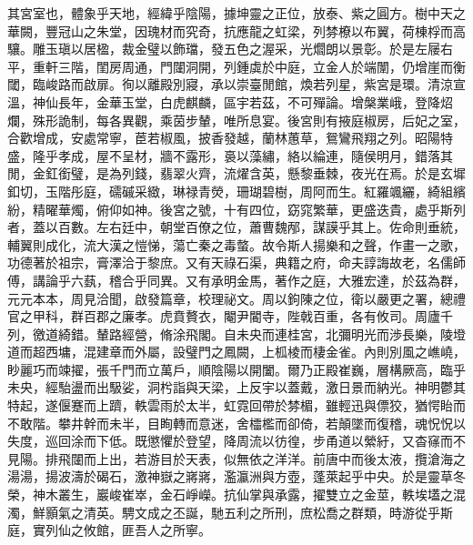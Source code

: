 \begin{pinyinscope}
其宮室也，體象乎天地，經緯乎陰陽，據坤靈之正位，放泰、紫之圓方。樹中天之華闕，豐冠山之朱堂，因瑰材而究奇，抗應龍之虹梁，列棼橑以布翼，荷棟桴而高驤。雕玉瑱以居楹，裁金璧以飾璫，發五色之渥采，光爓朗以景彰。於是左屦右平，重軒三階，閨房周通，門闥洞開，列鍾虡於中庭，立金人於端闈，仍增崖而衡閾，臨峻路而啟扉。徇以離殿別寢，承以崇臺閒館，煥若列星，紫宮是環。清涼宣溫，神仙長年，金華玉堂，白虎麒麟，區宇若茲，不可殫論。增槃業峨，登降炤爛，殊形詭制，每各異觀，乘茵步輦，唯所息宴。後宮則有掖庭椒房，后妃之室，合歡增成，安處常寧，茞若椒風，披香發越，蘭林蕙草，鴛鸞飛翔之列。昭陽特盛，隆乎孝成，屋不呈材，牆不露形，裛以藻繡，絡以綸連，隨侯明月，錯落其閒，金釭銜璧，是為列錢，翡翠火齊，流燿含英，懸黎垂棘，夜光在焉。於是玄墀釦切，玉階彤庭，礝磩采緻，琳禄青熒，珊瑚碧樹，周阿而生。紅羅颯纚，綺組繽紛，精曜華燭，俯仰如神。後宮之號，十有四位，窈窕繁華，更盛迭貴，處乎斯列者，蓋以百數。左右廷中，朝堂百僚之位，蕭曹魏邴，謀謨乎其上。佐命則垂統，輔翼則成化，流大漢之愷悌，蕩亡秦之毒螫。故令斯人揚樂和之聲，作畫一之歌，功德著於祖宗，膏澤洽于黎庶。又有天祿石渠，典籍之府，命夫諄誨故老，名儒師傅，講論乎六蓺，稽合乎同異。又有承明金馬，著作之庭，大雅宏達，於茲為群，元元本本，周見洽聞，啟發篇章，校理祕文。周以鉤陳之位，衛以嚴更之署，總禮官之甲科，群百郡之廉孝。虎賁贅衣，閹尹閽寺，陛戟百重，各有攸司。周廬千列，徼道綺錯。輦路經營，脩涂飛閣。自未央而連桂宮，北彌明光而渉長樂，陵墱道而超西墉，混建章而外屬，設璧門之鳳闕，上柧棱而棲金雀。內則別風之嶕嶢，眇麗巧而竦擢，張千門而立萬戶，順陰陽以開闔。爾乃正殿崔巍，層構厥高，臨乎未央，經駘盪而出馺娑，洞枍詣與天梁，上反宇以蓋戴，激日景而納光。神明鬱其特起，遂偃蹇而上躋，軼雲雨於太半，虹霓回帶於棼楣，雖輕迅與僄狡，猶愕眙而不敢階。攀井幹而未半，目眴轉而意迷，舍櫺檻而卻倚，若顛墜而復稽，魂怳怳以失度，巡回涂而下低。既懲懼於登望，降周流以彷徨，步甬道以縈紆，又杳窱而不見陽。排飛闥而上出，若游目於天表，似無依之洋洋。前唐中而後太液，攬滄海之湯湯，揚波濤於碣石，激神嶽之嶈嶈，濫瀛洲與方壺，蓬萊起乎中央。於是靈草冬榮，神木叢生，巖峻崔崒，金石崢嶸。抗仙掌與承露，擢雙立之金莖，軼埃壒之混濁，鮮顥氣之清英。騁文成之丕誕，馳五利之所刑，庶松喬之群類，時游從乎斯庭，實列仙之攸館，匪吾人之所寧。


\end{pinyinscope}
